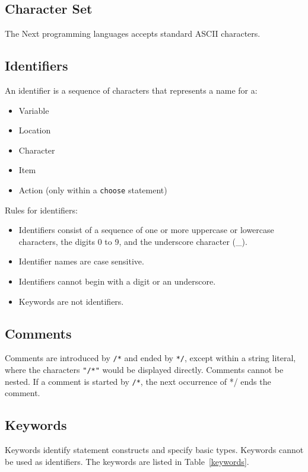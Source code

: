 \documentclass[12pt]{article}
\begin{document}
\subsection{Character Set}
The Next programming languages accepts standard ASCII characters.

\subsection{Identifiers}
An identifier is a sequence of characters that represents a name for a:
\begin{itemize}
\item Variable
\item Location
\item Character
\item Item
\item Action (only within a \texttt{choose} statement) \\
\end{itemize}

\noindent Rules for identifiers:
\begin{itemize}
\item Identifiers consist of a sequence of one or more uppercase or lowercase characters, the digits 0 to 9, and the underscore character (\_).
\item Identifier names are case sensitive.
\item Identifiers cannot begin with a digit or an underscore.
\item Keywords are not identifiers.
\end{itemize}

\subsection{Comments}
Comments are introduced by \texttt{/*} and ended by \texttt{*/}, except within a string literal, where the characters \texttt{"/*"} would be displayed directly.  Comments cannot be nested.  If a comment is started by \texttt{/*}, the next occurrence of */ ends the comment.

\subsection{Keywords}
Keywords identify statement constructs and specify basic types.  Keywords cannot be used as identifiers.  The keywords are listed in Table~\ref{keywords}.
\end{document}
